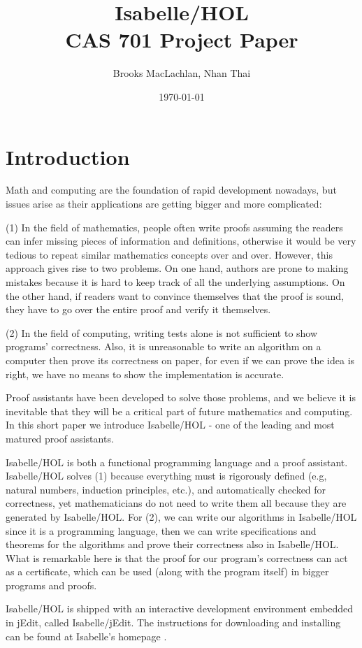 \documentclass{article}
\title{Isabelle/HOL \\ \large CAS 701 Project Paper}
\author{Brooks MacLachlan, Nhan Thai}
\date{\today}
\begin{document}
	
\maketitle

\newpage
\section{Introduction}
Math and computing are the foundation of rapid development nowadays, but issues 
arise as their applications are getting bigger and
more complicated:

(1) In the field of mathematics, people often write proofs assuming
the readers can infer missing pieces of information and definitions,
otherwise it would be very tedious to repeat similar mathematics concepts
over and over. However, this approach gives rise to two problems. On one hand,
authors are prone to making mistakes because it is hard to
keep track of all the underlying assumptions. On the other hand, if readers
want to convince themselves that the proof is sound, they have to go over the entire
proof and verify it themselves.

(2) In the field of computing, writing tests alone is not
sufficient to show programs' correctness.
Also, it is unreasonable to write an algorithm on a computer then prove its
correctness on paper, for even if we can prove the idea is right, we have
no means to show the implementation is accurate.


Proof assistants have been developed to solve those problems,
and we believe it is inevitable that they will be a critical part of future mathematics and computing.
In this short paper we introduce Isabelle/HOL - one of the leading and most matured proof assistants.

Isabelle/HOL is both a functional programming language and a proof assistant.
Isabelle/HOL solves (1) because everything must is rigorously defined (e.g, 
natural numbers, induction principles, etc.),
and automatically checked for correctness, yet mathematicians do not need to 
write them all
because they are generated by Isabelle/HOL. For (2), we can write our 
algorithms in Isabelle/HOL since
it is a programming language, then we can write specifications and theorems for 
the algorithms and prove their
correctness also in Isabelle/HOL. What is remarkable here is that the proof for our program's correctness
can act as a certificate, which can be used (along with the program itself) in bigger programs and proofs.

Isabelle/HOL is shipped with an interactive development environment embedded in 
jEdit, called Isabelle/jEdit.
The instructions for downloading and installing can be found at Isabelle's 
homepage \cite{IsabelleWebsite}.
\end{document}
